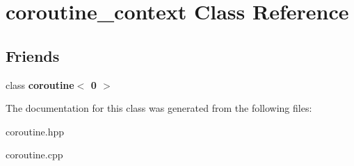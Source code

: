 \hypertarget{classcoroutine__context}{}\section{coroutine\+\_\+context Class Reference}
\label{classcoroutine__context}
\subsection*{Friends}
\begin{DoxyCompactItemize}
\item 
class {\bfseries coroutine$<$ 0 $>$}\hypertarget{classcoroutine__context_a874ca9b5dbeb1f6d90f61bc87474e164}{}\label{classcoroutine__context_a874ca9b5dbeb1f6d90f61bc87474e164}

\end{DoxyCompactItemize}


The documentation for this class was generated from the following files\+:\begin{DoxyCompactItemize}
\item 
coroutine.\+hpp\item 
coroutine.\+cpp\end{DoxyCompactItemize}
